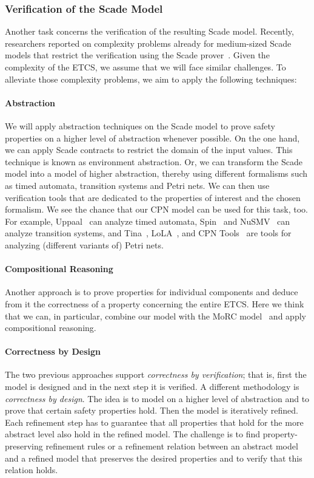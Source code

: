 \subsubsection{Verification of the Scade Model}

Another task concerns the verification of the resulting Scade model. Recently, researchers reported on complexity problems already for medium-sized Scade models that restrict the verification using the Scade prover~\cite{HuhnM2014scp,DaskayaHM2011fmics}. Given the complexity of the ETCS, we assume that we will face similar challenges. To alleviate those complexity problems, we aim to apply the following techniques:
 
\paragraph{Abstraction}  We will apply abstraction techniques on the Scade model to prove safety properties on a higher level of abstraction whenever possible. On the one hand, we can apply Scade contracts to restrict the domain of the input values. This technique is known as environment abstraction. Or, we can transform the Scade model into a model of higher abstraction, thereby using different formalisms such as timed automata, transition systems and Petri nets. We can then use verification tools that are dedicated to the properties of interest and the chosen formalism. We see the chance that our CPN model can be used for this task, too. For example, Uppaal~\cite{BehrmannDLHPYH2006} can analyze timed automata, Spin~\cite{Holzmann97} and NuSMV~\cite{CimattiCGGPRST2002} can analyze transition systems, and Tina~\cite{BerthomieuV2006}, LoLA~\cite{Wolf2007}, and CPN Tools~\cite{Westergaard2013apn} are tools for analyzing (different variants of) Petri nets.

\paragraph{Compositional Reasoning} Another approach is to prove properties for individual components and deduce from it the correctness of a property concerning the entire ETCS. Here we think that we can, in particular, combine our model with the MoRC model~\cite{braunstein_MorC_2013} and apply compositional reasoning. 

\paragraph{Correctness by Design} The two previous approaches support \textit{correctness by verification}; that is, first the model is designed and in the next step it is verified. A different methodology is \textit{correctness by design}. The idea is to model on a higher level of abstraction and to prove that certain safety properties hold. Then the model is iteratively refined. Each refinement step has to guarantee that all properties that hold for the more abstract level also hold in the refined model. The challenge is to find property-preserving refinement rules or a refinement relation between an abstract model and a refined model that preserves the desired properties and to verify that this relation holds. 

